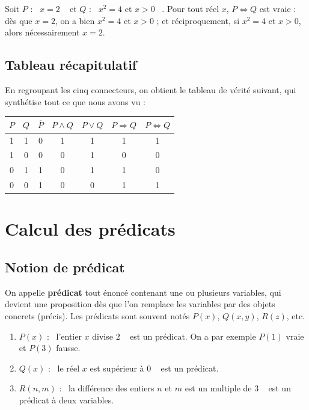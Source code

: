 \documentclass[a4paper,12pt,openany]{book}
\providecommand{\og}{\guillemotleft~}
\providecommand{\fg}{\ifhmode~\fi\guillemotright}
\begin{document}
\begin{exemple}
Soit $P$ : \og $x=2$ \fg{} et $Q$ : \og $x^2=4$ et $x>0$ \fg. Pour tout réel
$x$, $P\Leftrightarrow Q$ est vraie : dès que $x=2$, on a bien $x^2=4$ et
$x>0$ ; et réciproquement, si $x^2=4$ et $x>0$, alors nécessairement $x=2$.
\end{exemple}

\subsection{Tableau récapitulatif}

En regroupant les cinq connecteurs, on obtient le tableau de vérité suivant,
qui synthétise tout ce que nous avons vu :

\begin{center}
\begin{tabular}{|c|c|c|c|c|c|c|}
\hline
$P$ & $Q$ & $\overline{P}$ & $P\wedge Q$ & $P\vee Q$ & $P\Rightarrow Q$ & $P\Leftrightarrow Q$\\
\hline
1 & 1 & 0 & 1 & 1 & 1 & 1 \\
1 & 0 & 0 & 0 & 1 & 0 & 0 \\
0 & 1 & 1 & 0 & 1 & 1 & 0 \\
0 & 0 & 1 & 0 & 0 & 1 & 1 \\
\hline
\end{tabular}
\end{center}

\section{Calcul des prédicats}

\subsection{Notion de prédicat}


\begin{definition}
On appelle \textbf{prédicat} tout énoncé contenant une ou plusieurs variables,
qui devient une proposition dès que l'on remplace les variables par des objets
concrets (précis). Les prédicats sont souvent notés $P(x)$, $Q(x,y)$, $R(z)$,
etc.
\end{definition}

\begin{exemple}
\begin{enumerate}
  \item $P(x)$ : \og l'entier $x$ divise $2$ \fg{} est un prédicat. On a par
  exemple $P(1)$ vraie et $P(3)$ fausse.
  \item $Q(x)$ : \og le réel $x$ est supérieur à $0$ \fg{} est un prédicat.
  \item $R(n,m)$ : \og la différence des entiers $n$ et $m$ est un multiple de
  $3$ \fg{} est un prédicat à deux variables.
\end{enumerate}
\end{exemple}
\end{document}
